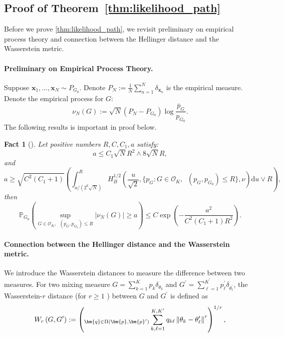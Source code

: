\documentclass[twoside]{article}
\DeclareMathOperator*{\hels}{D_{h}^2}
\let\inf\relax
\DeclareMathOperator*\inf{\vphantom{p}inf}
\theoremstyle{plain}
\newtheorem{fact}{Fact}
\theoremstyle{definition}
\theoremstyle{plain}
\def\rvx{{\mathbf{x}}}
\def\vp{{\bm{p}}}
\def\vq{{\bm{q}}}
\def\sP{{\mathbb{P}}}
\begin{document}
\subsection{Proof of Theorem~\ref{thm:likelihood_path}}

Before we prove \cref{thm:likelihood_path}, we revisit preliminary on empirical process theory and connection between the Hellinger distance and the Wasserstein metric.

\paragraph{Preliminary on Empirical Process Theory.}

Suppose $\rvx_1, \ldots, \rvx_N \sim P_{G_0}$. Denote $P_N := \frac{1}{N} \sum_{n = 1}^N \delta_{\rvx_n}$ is the empirical measure. Denote the empirical process for $G$: $$\nu_N (G) := \sqrt{N} (P_N - P_{G_0}) \log{\frac{\bar{p}_{G}}{p_{G_0}}}.$$ The following results is important in proof below.

\begin{fact}[{\citealp[Theorem 5.11]{van_de_geer_empirical_2000}}]\label{thm:empirical_process}
    Let positive numbers $R, C, C_1, a$ satisfy: $$a \leq C_1 \sqrt{N} R^2 \land 8 \sqrt{N} R,$$ and $$a \geq \sqrt{C^2 (C_1 + 1)} \left( \int_{a/(2^6 \sqrt{N})}^R H^{1/2}_B \left( \frac{u}{\sqrt{2}}, \{ p_G : G \in \mathcal{O}_K, \hels (p_G, p_{G_0}) \leq R\}, \nu \right) \mathrm{d} u \lor R \right),$$ then $$\sP_{G_0} \left( \sup_{G \in \mathcal{O}_K, \hels (p_G, p_{G_0}) \leq R} |\nu_N (G)| \geq a \right) \leq C \exp{ \left(- \frac{a^2}{C^2(C_1 + 1) R^2} \right)}.$$
\end{fact}

\paragraph{Connection between the
Hellinger distance and the Wasserstein metric.}
We introduce the Wasserstein distances to measure the difference between two measures. For two mixing measure $G=\sum_{k=1}^{K} p_{k} \delta_{\theta_{k}}$ and $G^{\prime}=\sum_{\ell=1}^{K^{\prime}} p_{\ell}^{\prime} \delta_{\theta_{\ell}^{\prime}}$, the Wasserstein-$r$ distance (for $r \geq 1$ ) between $G$ and $G^{\prime}$ is defined as
\begin{align}
    W_{r}\left(G, G^{\prime}\right):=\left(\inf _{\vq \in \Pi\left(\vp, \vp^{\prime}\right)} \sum_{k, \ell=1}^{K, K^{\prime}} q_{k \ell}\left\|\theta_{k}-\theta_{\ell}^{\prime}\right\|^{r}\right)^{1 / r},\label{eq:wasserstein_metric}
\end{align}
\end{document}
